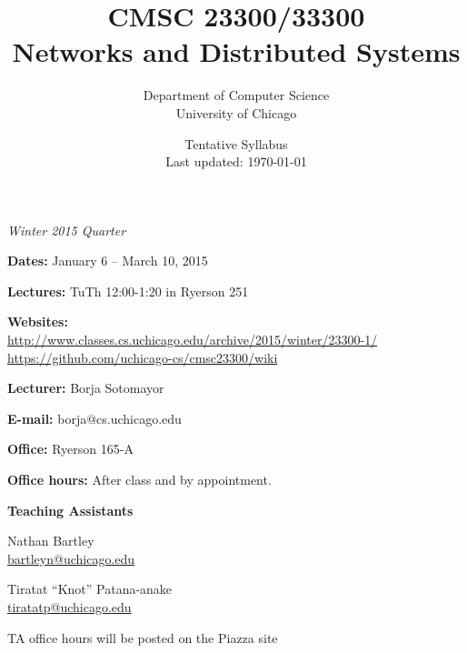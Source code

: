 \documentclass[11pt]{article}
\title{CMSC 23300/33300\\Networks and Distributed Systems}
\author{Department of Computer Science\\University of Chicago}
\date{{\color{red} Tentative Syllabus}\\Last updated: \today}
\begin{document}
\maketitle
\thispagestyle{empty}

\begin{center}
\begin{minipage}{0.6\textwidth}
\begin{center}
\emph{Winter 2015 Quarter}
\end{center}
\textbf{Dates:} January 6 -- March 10, 2015

\textbf{Lectures:} TuTh 12:00-1:20 in Ryerson 251

\textbf{Websites:}\\
 \url{http://www.classes.cs.uchicago.edu/archive/2015/winter/23300-1/}\\
 \url{https://github.com/uchicago-cs/cmsc23300/wiki}
\
\vspace{1em}

\textbf{Lecturer:} Borja Sotomayor

\textbf{E-mail:} borja@cs.uchicago.edu

\textbf{Office:} Ryerson 165-A

\textbf{Office hours:} After class and by appointment.

\end{minipage}

\vspace{2ex}
\textbf{Teaching Assistants}
\vspace{1ex}

\begin{minipage}[t]{0.35\textwidth}
\begin{center}
Nathan Bartley\\\url{bartleyn@uchicago.edu}
\end{center}
\end{minipage}
\hspace{1ex}
\begin{minipage}[t]{0.35\textwidth}
\begin{center}
Tiratat ``Knot'' Patana-anake\\\url{tiratatp@uchicago.edu}
\end{center}
\end{minipage}

\vspace{1ex}

TA office hours will be posted on the Piazza site

\end{center}
\end{document}
